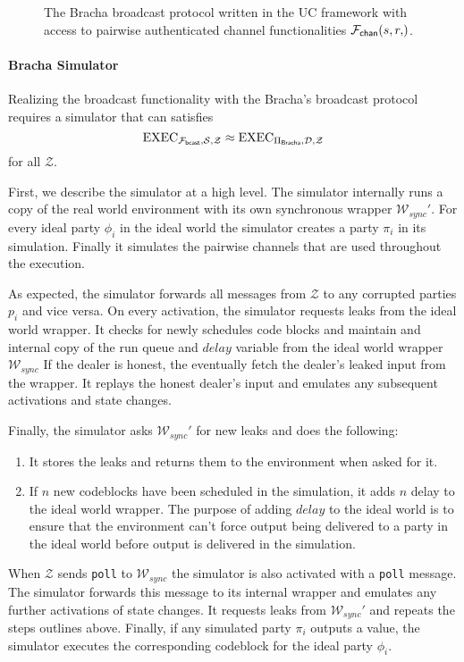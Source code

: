 \begin{figure}
	
	\caption{The Bracha broadcast protocol written in the UC framework with access to pairwise authenticated channel functionalities $\Fchan{s,r}$.}
	\label{fig:prot:bracha_ours}
\end{figure}

\paragraph{Bracha Simulator}
Realizing the broadcast functionality with the Bracha's broadcast protocol requires a simulator that can satisfies
\[ \text{EXEC}_{\mathcal{F_{{\mathsf {bcast}}}},\mathcal{S},\mathcal{Z}} \approx \text{EXEC}_{\Pi_{{\mathsf {Bracha}}},\mathcal{D},\mathcal{Z}} \]
for all $\mathcal{Z}$.

First, we describe the simulator at a high level.
The simulator internally runs a copy of the real world environment with its own synchronous wrapper $\mathcal{W}_{sync}'$.
For every ideal party $\phi_i$ in the ideal world the simulator creates a party $\pi_i$ in its simulation.
Finally it simulates the pairwise channels that are used throughout the execution.

As expected, the simulator forwards all messages from $\mathcal{Z}$ to any corrupted parties $p_i$ and vice versa.
On every activation, the simulator requests leaks from the ideal world wrapper.
It checks for newly schedules code blocks and maintain and internal copy of the run queue and $delay$ variable from the ideal world wrapper $\mathcal{W}_{sync}$
If the dealer is honest, the eventually fetch the dealer's leaked input from the wrapper. 
It replays the honest dealer's input and emulates any subsequent activations and state changes.

Finally, the simulator asks $\mathcal{W}_{sync}'$ for new leaks and does the following:
\begin{enumerate}
	\item It stores the leaks and returns them to the environment when asked for it.
	\item If $n$ new codeblocks have been scheduled in the simulation, it adds $n$ delay to the ideal world wrapper. The purpose of adding $delay$ to the ideal world is to ensure that the environment can't force output being delivered to a party in the ideal world before output is delivered in the simulation.
\end{enumerate}

When $\mathcal{Z}$ sends \texttt{poll} to $\mathcal{W}_{sync}$ the simulator is also activated with a \texttt{poll} message.
The simulator forwards this message to its internal wrapper and emulates any further activations of state changes.
It requests leaks from $\mathcal{W}_{sync}'$ and repeats the steps outlines above.
Finally, if any simulated party $\pi_i$ outputs a value, the simulator executes the corresponding codeblock for the ideal party $\phi_i$.

